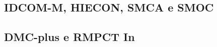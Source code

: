 
\subsection{IDCOM-M, HIECON, SMCA e SMOC}
\label{subsec:idcomm}


\subsection{DMC-plus e RMPCT In}
\label{subsec:dmcplus}

